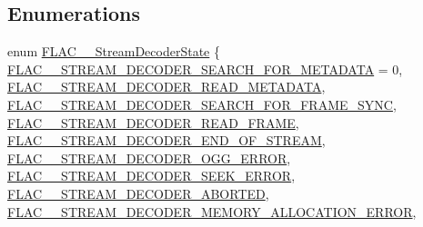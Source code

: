 \subsection*{Enumerations}
\begin{DoxyCompactItemize}
\item 
enum \mbox{\hyperlink{group__flac__stream__decoder_ga3adb6891c5871a87cd5bbae6c770ba2d}{F\+L\+A\+C\+\_\+\+\_\+\+Stream\+Decoder\+State}} \{ \newline
\mbox{\hyperlink{group__flac__stream__decoder_gga3adb6891c5871a87cd5bbae6c770ba2dacf4455f4f681a6737a553e10f614704a}{F\+L\+A\+C\+\_\+\+\_\+\+S\+T\+R\+E\+A\+M\+\_\+\+D\+E\+C\+O\+D\+E\+R\+\_\+\+S\+E\+A\+R\+C\+H\+\_\+\+F\+O\+R\+\_\+\+M\+E\+T\+A\+D\+A\+TA}} = 0, 
\mbox{\hyperlink{group__flac__stream__decoder_gga3adb6891c5871a87cd5bbae6c770ba2da4c1853ed1babdcede9a908e12cf7ccf7}{F\+L\+A\+C\+\_\+\+\_\+\+S\+T\+R\+E\+A\+M\+\_\+\+D\+E\+C\+O\+D\+E\+R\+\_\+\+R\+E\+A\+D\+\_\+\+M\+E\+T\+A\+D\+A\+TA}}, 
\mbox{\hyperlink{group__flac__stream__decoder_gga3adb6891c5871a87cd5bbae6c770ba2daccff915757978117720ba1613d088ddf}{F\+L\+A\+C\+\_\+\+\_\+\+S\+T\+R\+E\+A\+M\+\_\+\+D\+E\+C\+O\+D\+E\+R\+\_\+\+S\+E\+A\+R\+C\+H\+\_\+\+F\+O\+R\+\_\+\+F\+R\+A\+M\+E\+\_\+\+S\+Y\+NC}}, 
\mbox{\hyperlink{group__flac__stream__decoder_gga3adb6891c5871a87cd5bbae6c770ba2da06dc6158a51a8eb9537b65f2fbb6dc49}{F\+L\+A\+C\+\_\+\+\_\+\+S\+T\+R\+E\+A\+M\+\_\+\+D\+E\+C\+O\+D\+E\+R\+\_\+\+R\+E\+A\+D\+\_\+\+F\+R\+A\+ME}}, 
\newline
\mbox{\hyperlink{group__flac__stream__decoder_gga3adb6891c5871a87cd5bbae6c770ba2da28ce845052d9d1a780f4107e97f4c853}{F\+L\+A\+C\+\_\+\+\_\+\+S\+T\+R\+E\+A\+M\+\_\+\+D\+E\+C\+O\+D\+E\+R\+\_\+\+E\+N\+D\+\_\+\+O\+F\+\_\+\+S\+T\+R\+E\+AM}}, 
\mbox{\hyperlink{group__flac__stream__decoder_gga3adb6891c5871a87cd5bbae6c770ba2da3bc0343f47153c5779baf7f37f6e95cf}{F\+L\+A\+C\+\_\+\+\_\+\+S\+T\+R\+E\+A\+M\+\_\+\+D\+E\+C\+O\+D\+E\+R\+\_\+\+O\+G\+G\+\_\+\+E\+R\+R\+OR}}, 
\mbox{\hyperlink{group__flac__stream__decoder_gga3adb6891c5871a87cd5bbae6c770ba2daf2c6efcabdfe889081c2260e6681db49}{F\+L\+A\+C\+\_\+\+\_\+\+S\+T\+R\+E\+A\+M\+\_\+\+D\+E\+C\+O\+D\+E\+R\+\_\+\+S\+E\+E\+K\+\_\+\+E\+R\+R\+OR}}, 
\mbox{\hyperlink{group__flac__stream__decoder_gga3adb6891c5871a87cd5bbae6c770ba2dadb52ab4785bd2eb84a95e8aa82311cd5}{F\+L\+A\+C\+\_\+\+\_\+\+S\+T\+R\+E\+A\+M\+\_\+\+D\+E\+C\+O\+D\+E\+R\+\_\+\+A\+B\+O\+R\+T\+ED}}, 
\newline
\mbox{\hyperlink{group__flac__stream__decoder_gga3adb6891c5871a87cd5bbae6c770ba2da0d08c527252420813e6a6d6d3e19324a}{F\+L\+A\+C\+\_\+\+\_\+\+S\+T\+R\+E\+A\+M\+\_\+\+D\+E\+C\+O\+D\+E\+R\+\_\+\+M\+E\+M\+O\+R\+Y\+\_\+\+A\+L\+L\+O\+C\+A\+T\+I\+O\+N\+\_\+\+E\+R\+R\+OR}}, 

\end{DoxyCompactItemize}
